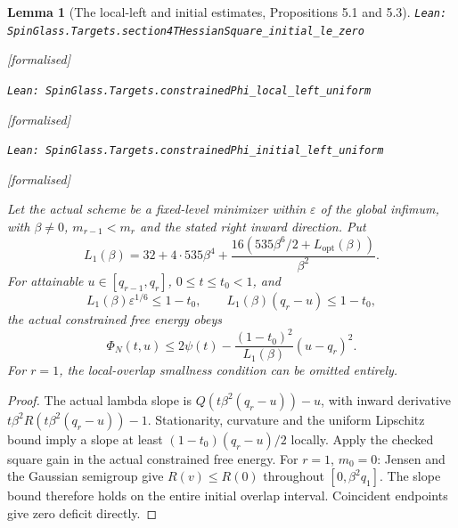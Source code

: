 \documentclass[11pt]{article}
\providecommand{\lean}[1]{\leavevmode\par\nopagebreak
  {\noindent\normalfont\footnotesize\raggedright\texttt{Lean: #1}\par}\nopagebreak}
\providecommand{\leanok}{\par\nopagebreak
  {\noindent\normalfont\footnotesize\textcolor{green!50!black}{[formalised]}\par}\nopagebreak}
\newtheorem{lemma}[theorem]{Lemma}
\begin{document}
\begin{lemma}[The local-left and initial estimates, Propositions 5.1 and 5.3]
\lean{SpinGlass.Targets.section4THessianSquare\_initial\_le\_zero}\leanok
\lean{SpinGlass.Targets.constrainedPhi\_local\_left\_uniform}\leanok
\lean{SpinGlass.Targets.constrainedPhi\_initial\_left\_uniform}\leanok
Let the actual scheme be a fixed-level minimizer within $\varepsilon$ of
the global infimum, with $\beta\ne0$, $m_{r-1}<m_r$ and the stated right
inward direction. Put
\[
 L_1(\beta)=32+4\cdot535\beta^4+
 \frac{16(535\beta^6/2+L_{\mathrm{opt}}(\beta))}{\beta^2}.
\]
For attainable $u\in[q_{r-1},q_r]$, $0\le t\le t_0<1$, and
\[
 L_1(\beta)\varepsilon^{1/6}\le1-t_0,\qquad
 L_1(\beta)(q_r-u)\le1-t_0,
\]
the actual constrained free energy obeys
\[
 \Phi_N(t,u)\le2\psi(t)-\frac{(1-t_0)^2}{L_1(\beta)}(u-q_r)^2.
\]
For $r=1$, the local-overlap smallness condition can be omitted entirely.
\end{lemma}
\begin{proof}
The actual lambda slope is $Q(t\beta^2(q_r-u))-u$, with inward derivative
$t\beta^2R(t\beta^2(q_r-u))-1$. Stationarity, curvature and the uniform
Lipschitz bound imply a slope at least $(1-t_0)(q_r-u)/2$ locally. Apply
the checked square gain in the actual constrained free energy.
For $r=1$, $m_0=0$: Jensen and the Gaussian semigroup give $R(v)\le R(0)$
throughout $[0,\beta^2q_1]$. The slope bound therefore holds on the entire
initial overlap interval. Coincident endpoints give zero deficit directly.
\end{proof}
\end{document}
